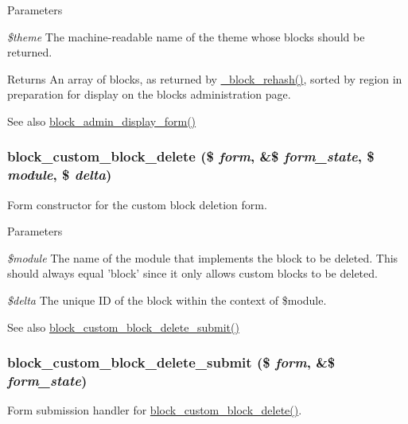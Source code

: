 \begin{DoxyParams}{Parameters}
\item[{\em \$theme}]The machine-\/readable name of the theme whose blocks should be returned.\end{DoxyParams}
\begin{DoxyReturn}{Returns}
An array of blocks, as returned by \hyperlink{block_8module_aa42865f9782787a854c27877cb850dbc}{\_\-block\_\-rehash()}, sorted by region in preparation for display on the blocks administration page.
\end{DoxyReturn}
\begin{DoxySeeAlso}{See also}
\hyperlink{group__forms_ga19dc9d98e83e7e7c9574298100752ba7}{block\_\-admin\_\-display\_\-form()} 
\end{DoxySeeAlso}
\hypertarget{block_8admin_8inc_a4a3fd0e8a27350b661073c26ced2912d}{
\subsubsection[{block\_\-custom\_\-block\_\-delete}]{\setlength{\rightskip}{0pt plus 5cm}block\_\-custom\_\-block\_\-delete (\$ {\em form}, \/  \&\$ {\em form\_\-state}, \/  \$ {\em module}, \/  \$ {\em delta})}}
\label{block_8admin_8inc_a4a3fd0e8a27350b661073c26ced2912d}
Form constructor for the custom block deletion form.


\begin{DoxyParams}{Parameters}
\item[{\em \$module}]The name of the module that implements the block to be deleted. This should always equal 'block' since it only allows custom blocks to be deleted. \item[{\em \$delta}]The unique ID of the block within the context of \$module.\end{DoxyParams}
\begin{DoxySeeAlso}{See also}
\hyperlink{block_8admin_8inc_afef082a966e26b8dc09febab599ddbef}{block\_\-custom\_\-block\_\-delete\_\-submit()} 
\end{DoxySeeAlso}
\hypertarget{block_8admin_8inc_afef082a966e26b8dc09febab599ddbef}{
\subsubsection[{block\_\-custom\_\-block\_\-delete\_\-submit}]{\setlength{\rightskip}{0pt plus 5cm}block\_\-custom\_\-block\_\-delete\_\-submit (\$ {\em form}, \/  \&\$ {\em form\_\-state})}}
\label{block_8admin_8inc_afef082a966e26b8dc09febab599ddbef}
Form submission handler for \hyperlink{block_8admin_8inc_a4a3fd0e8a27350b661073c26ced2912d}{block\_\-custom\_\-block\_\-delete()}.

